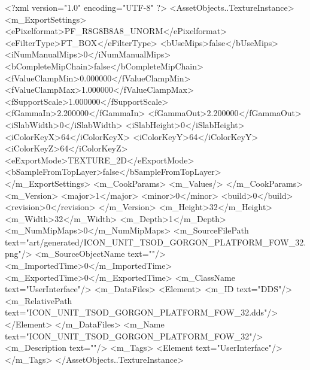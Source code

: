 <?xml version="1.0" encoding="UTF-8" ?>
<AssetObjects..TextureInstance>
	<m_ExportSettings>
		<ePixelformat>PF_R8G8B8A8_UNORM</ePixelformat>
		<eFilterType>FT_BOX</eFilterType>
		<bUseMips>false</bUseMips>
		<iNumManualMips>0</iNumManualMips>
		<bCompleteMipChain>false</bCompleteMipChain>
		<fValueClampMin>0.000000</fValueClampMin>
		<fValueClampMax>1.000000</fValueClampMax>
		<fSupportScale>1.000000</fSupportScale>
		<fGammaIn>2.200000</fGammaIn>
		<fGammaOut>2.200000</fGammaOut>
		<iSlabWidth>0</iSlabWidth>
		<iSlabHeight>0</iSlabHeight>
		<iColorKeyX>64</iColorKeyX>
		<iColorKeyY>64</iColorKeyY>
		<iColorKeyZ>64</iColorKeyZ>
		<eExportMode>TEXTURE_2D</eExportMode>
		<bSampleFromTopLayer>false</bSampleFromTopLayer>
	</m_ExportSettings>
	<m_CookParams>
		<m_Values/>
	</m_CookParams>
	<m_Version>
		<major>1</major>
		<minor>0</minor>
		<build>0</build>
		<revision>0</revision>
	</m_Version>
	<m_Height>32</m_Height>
	<m_Width>32</m_Width>
	<m_Depth>1</m_Depth>
	<m_NumMipMaps>0</m_NumMipMaps>
	<m_SourceFilePath text="art/generated/ICON_UNIT_TSOD_GORGON_PLATFORM_FOW_32.png"/>
	<m_SourceObjectName text=""/>
	<m_ImportedTime>0</m_ImportedTime>
	<m_ExportedTime>0</m_ExportedTime>
	<m_ClassName text="UserInterface"/>
	<m_DataFiles>
		<Element>
			<m_ID text="DDS"/>
			<m_RelativePath text="ICON_UNIT_TSOD_GORGON_PLATFORM_FOW_32.dds"/>
		</Element>
	</m_DataFiles>
	<m_Name text="ICON_UNIT_TSOD_GORGON_PLATFORM_FOW_32"/>
	<m_Description text=""/>
	<m_Tags>
		<Element text="UserInterface"/>
	</m_Tags>
</AssetObjects..TextureInstance>
